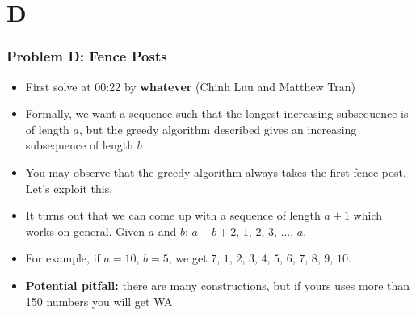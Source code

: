 \section{D}%
\label{sec:d}

\begin{frame}
  \frametitle{Problem D: Fence Posts}

  \begin{itemize}
    \item First solve at 00:22 by \textbf{whatever} (Chinh Luu and Matthew Tran)
    \item Formally, we want a sequence such that the longest increasing subsequence is of length $a$, but the greedy algorithm described gives an increasing subsequence of length $b$
    \item You may observe that the greedy algorithm always takes the first fence post. Let's exploit this.
    \item It turns out that we can come up with a sequence of length $a+1$ which works on general. Given $a$ and $b$: $a-b+2$, $1$, $2$, $3$, $\dots$, $a$.
    \item For example, if $a=10$, $b=5$, we get $7$, $1$, $2$, $3$, $4$, $5$, $6$, $7$, $8$, $9$, $10$.
    \item \textbf{Potential pitfall:} there are many constructions, but if yours uses more than 150 numbers you will get WA
  \end{itemize}
\end{frame}
